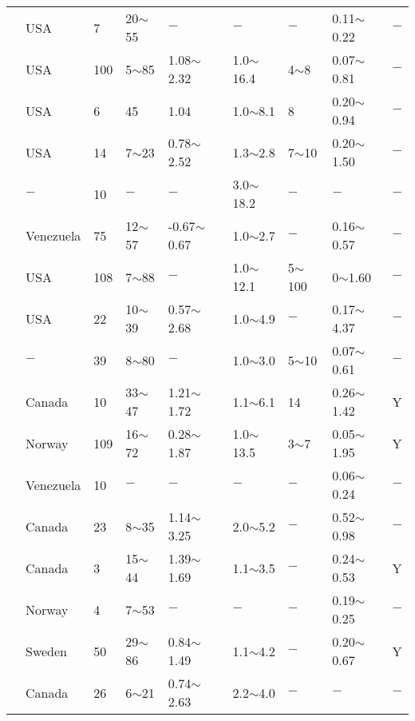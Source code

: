 {\begin{longtable}{lllllllll}
    \citet{Ladd1981643} & USA   & 7     & 20$\sim$55 & $-$     & $-$     & $-$     & 0.11$\sim$0.22 & $-$ \\
    \citet{Ladd1991540} & USA   & 100   & 5$\sim$85  & 1.08$\sim$2.32 & 1.0$\sim$16.4 & 4$\sim$8   & 0.07$\sim$0.81 & $-$ \\
    \citet{Ladd1971}& USA   & 6     & 45    & 1.04  & 1.0$\sim$8.1 & 8     & 0.20$\sim$0.94 & $-$ \\
    \citet{Ladd1972211} & USA   & 14    & 7$\sim$23  & 0.78$\sim$2.52 & 1.3$\sim$2.8 & 7$\sim$10  & 0.20$\sim$1.50 & $-$ \\
    \citet{Ladd1977421} & $-$     & 10    & $-$     & $-$     & 3.0$\sim$18.2 & $-$     & $-$     & $-$ \\
    \citet{Ladd198365} & Venezuela & 75    & 12$\sim$57 & -0.67$\sim$0.67 & 1.0$\sim$2.7 & $-$     & 0.16$\sim$0.57 & $-$ \\
    \citet{Ladd1971} & USA   & 108   & 7$\sim$88  & $-$     & 1.0$\sim$12.1 & 5$\sim$100 & 0$\sim$1.60 & $-$ \\
    \citet{Ladd1974763} & USA   & 22    & 10$\sim$39 & 0.57$\sim$2.68 & 1.0$\sim$4.9 & $-$     & 0.17$\sim$4.37 & $-$ \\
    \citet{Ladd1963342} & $-$     & 39    & 8$\sim$80  & $-$     & 1.0$\sim$3.0 & 5$\sim$10  & 0.07$\sim$0.61 & $-$ \\
    \citet{Lafleur1988705} & Canada & 10    & 33$\sim$47 & 1.21$\sim$1.72 & 1.1$\sim$6.1 & 14    & 0.26$\sim$1.42 & Y \\
    \citet{Lacasse1982661} & Norway & 109   & 16$\sim$72 & 0.28$\sim$1.87 & 1.0$\sim$13.5 & 3$\sim$7   & 0.05$\sim$1.95 & Y \\
    \citet{Lambe196443} & Venezuela & 10    & $-$     & $-$     & $-$     & $-$     & 0.06$\sim$0.24 & $-$ \\
    \citet{LaRochelle1974142} & Canada & 23    & 8$\sim$35  & 1.14$\sim$3.25 & 2.0$\sim$5.2 & $-$     & 0.52$\sim$0.98 & $-$ \\
    \citet{LaRochelle1988831} & Canada & 3     & 15$\sim$44 & 1.39$\sim$1.69 & 1.1$\sim$3.5 & $-$     & 0.24$\sim$0.53 & Y \\
    \citet{Larsson1980591} & Norway & 4     & 7$\sim$53  & $-$     & $-$     & $-$     & 0.19$\sim$0.25 & $-$ \\
    \citet{Larsson1991} & Sweden & 50    & 29$\sim$86 & 0.84$\sim$1.49 & 1.1$\sim$4.2 & $-$     & 0.20$\sim$0.67 & Y \\
    \citet{Landva1988138} & Canada & 26    & 6$\sim$21  & 0.74$\sim$2.63 & 2.2$\sim$4.0 & $-$     & $-$     & $-$ \\

\end{longtable}}
